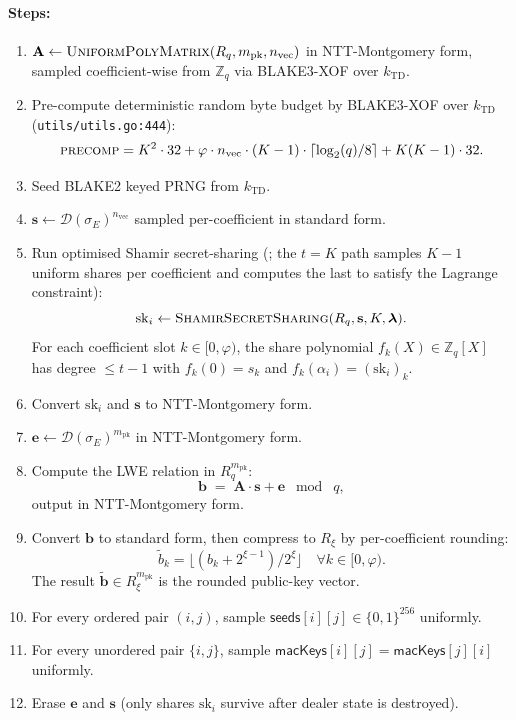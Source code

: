 \paragraph{Steps:}
\begin{enumerate}[leftmargin=2em, nosep]
\item $\mathbf{A} \leftarrow \textsc{UniformPolyMatrix}(R_q,
      m_{\mathrm{pk}}, n_{\mathrm{vec}})$ in NTT-Montgomery form,
      sampled coefficient-wise from $\mathbb{Z}_q$ via BLAKE3-XOF over
      $k_{\mathrm{TD}}$.
\item Pre-compute deterministic random byte budget by BLAKE3-XOF over
      $k_{\mathrm{TD}}$ \cite{blake3} (\texttt{utils/utils.go:444}):
      \[
        \textsc{precomp}
        = K^2 \cdot 32 + \varphi \cdot n_{\mathrm{vec}} \cdot (K-1)
          \cdot \lceil \log_2(q)/8 \rceil + K(K-1)\cdot 32.
      \]
\item Seed BLAKE2 keyed PRNG \cite{blake2} from $k_{\mathrm{TD}}$.
\item $\mathbf{s} \leftarrow \mathcal{D}(\sigma_E)^{n_{\mathrm{vec}}}$
      sampled per-coefficient in standard form.
\item Run optimised Shamir secret-sharing (\cite{lp077}; the $t = K$
      path samples $K - 1$ uniform shares per coefficient and computes
      the last to satisfy the Lagrange constraint):
      \[
        \mathrm{sk}_i \leftarrow \textsc{ShamirSecretSharing}(R_q,
        \mathbf{s}, K, \boldsymbol\lambda).
      \]
      For each coefficient slot $k \in [0, \varphi)$, the share
      polynomial $f_k(X) \in \mathbb{Z}_q[X]$ has degree $\leq t - 1$
      with $f_k(0) = s_k$ and $f_k(\alpha_i) = (\mathrm{sk}_i)_k$.
\item Convert $\mathrm{sk}_i$ and $\mathbf{s}$ to NTT-Montgomery form.
\item $\mathbf{e} \leftarrow \mathcal{D}(\sigma_E)^{m_{\mathrm{pk}}}$
      in NTT-Montgomery form.
\item Compute the LWE relation in $R_q^{m_{\mathrm{pk}}}$:
      \[
        \mathbf{b} \;=\; \mathbf{A} \cdot \mathbf{s} + \mathbf{e}
        \;\bmod\; q,
      \]
      output in NTT-Montgomery form.
\item Convert $\mathbf{b}$ to standard form, then compress to
      $R_\xi$ by per-coefficient rounding:
      \[
        \tilde b_k = \bigl\lfloor (b_k + 2^{\xi - 1}) / 2^{\xi}
                     \bigr\rfloor
        \quad \forall k \in [0, \varphi).
      \]
      The result $\tilde{\mathbf{b}} \in R_\xi^{m_{\mathrm{pk}}}$ is
      the rounded public-key vector.
\item For every ordered pair $(i, j)$, sample
      $\mathsf{seeds}[i][j] \in \{0,1\}^{256}$ uniformly.
\item For every unordered pair $\{i, j\}$, sample
      $\mathsf{macKeys}[i][j] = \mathsf{macKeys}[j][i]$ uniformly.
\item Erase $\mathbf{e}$ and $\mathbf{s}$ (only shares $\mathrm{sk}_i$
      survive after dealer state is destroyed).
\end{enumerate}

